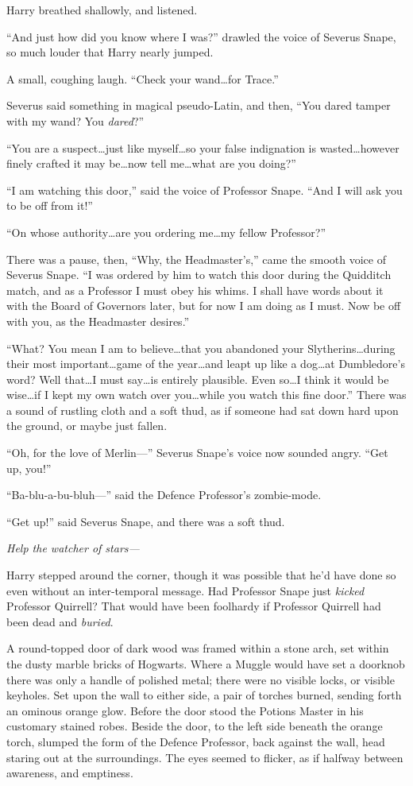 Harry breathed shallowly, and listened.

“And just how did you know where I was?” drawled the voice of Severus Snape, so much louder that Harry nearly jumped.

A small, coughing laugh.
“Check your wand…for Trace.”

Severus said something in magical pseudo-Latin, and then,
“You dared tamper with my wand? You \emph{dared}?”

“You are a suspect…just like myself…so your false indignation is wasted…however finely crafted it may be…now tell me…what are you doing?”

“I am watching this door,” said the voice of Professor Snape.
“And I will ask you to be off from it!”

“On whose authority…are you ordering me…my fellow Professor?”

There was a pause, then,
“Why, the Headmaster’s,” came the smooth voice of Severus Snape.
“I was ordered by him to watch this door during the Quidditch match, and as a Professor I must obey his whims. I shall have words about it with the Board of Governors later, but for now I am doing as I must. Now be off with you, as the Headmaster desires.”

“What? You mean I am to believe…that you abandoned your Slytherins…during their most important…game of the year…and leapt up like a dog…at Dumbledore’s word? Well that…I must say…is entirely plausible. Even so…I think it would be wise…if I kept my own watch over you…while you watch this fine door.” There was a sound of rustling cloth and a soft thud, as if someone had sat down hard upon the ground, or maybe just fallen.

“Oh, for the love of Merlin—” Severus Snape’s voice now sounded angry.
“Get up, you!”

“Ba-blu-a-bu-bluh—” said the Defence Professor’s zombie-mode.

“Get up!” said Severus Snape, and there was a soft thud.

\emph{Help the watcher of stars—}

Harry stepped around the corner, though it was possible that he’d have done so even without an inter-temporal message. Had Professor Snape just \emph{kicked} Professor Quirrell? That would have been foolhardy if Professor Quirrell had been dead and \emph{buried}.

A round-topped door of dark wood was framed within a stone arch, set within the dusty marble bricks of Hogwarts. Where a Muggle would have set a doorknob there was only a handle of polished metal; there were no visible locks, or visible keyholes. Set upon the wall to either side, a pair of torches burned, sending forth an ominous orange glow. Before the door stood the Potions Master in his customary stained robes. Beside the door, to the left side beneath the orange torch, slumped the form of the Defence Professor, back against the wall, head staring out at the surroundings. The eyes seemed to flicker, as if halfway between awareness, and emptiness.

